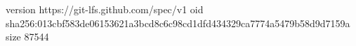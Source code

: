 version https://git-lfs.github.com/spec/v1
oid sha256:013cbf583de06153621a3bcd8c6c98cd1dfd434329ca7774a5479b58d9d7159a
size 87544
